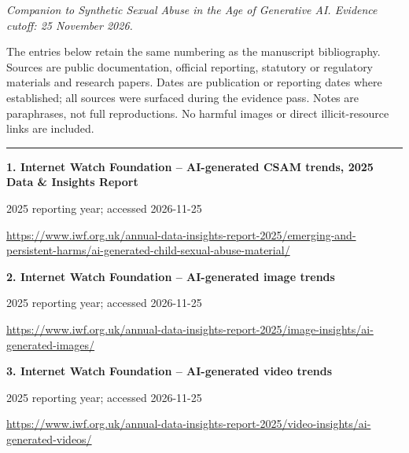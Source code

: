 \documentclass[11pt,a4paper]{article}
\begin{document}
\par\vspace{3mm}
\textit{Companion to Synthetic Sexual Abuse in the Age of Generative AI. Evidence cutoff: 25 November 2026.}\par
The entries below retain the same numbering as the manuscript bibliography. Sources are public documentation, official reporting, statutory or regulatory materials and research papers. Dates are publication or reporting dates where established; all sources were surfaced during the evidence pass. Notes are paraphrases, not full reproductions. No harmful images or direct illicit-resource links are included.\par\hrule\vspace{3mm}
\noindent\begin{minipage}{\linewidth}\textbf{1. Internet Watch Foundation -- AI-generated CSAM trends, 2025 Data \& Insights Report}\par{\small 2025 reporting year; accessed 2026-11-25\par\url{https://www.iwf.org.uk/annual-data-insights-report-2025/emerging-and-persistent-harms/ai-generated-child-sexual-abuse-material/}}\par
\end{minipage}\par\vspace{2mm}
\noindent\begin{minipage}{\linewidth}\textbf{2. Internet Watch Foundation -- AI-generated image trends}\par{\small 2025 reporting year; accessed 2026-11-25\par\url{https://www.iwf.org.uk/annual-data-insights-report-2025/image-insights/ai-generated-images/}}\par
\end{minipage}\par\vspace{2mm}
\noindent\begin{minipage}{\linewidth}\textbf{3. Internet Watch Foundation -- AI-generated video trends}\par{\small 2025 reporting year; accessed 2026-11-25\par\url{https://www.iwf.org.uk/annual-data-insights-report-2025/video-insights/ai-generated-videos/}}\par
\end{minipage}\par\vspace{2mm}
\end{document}
